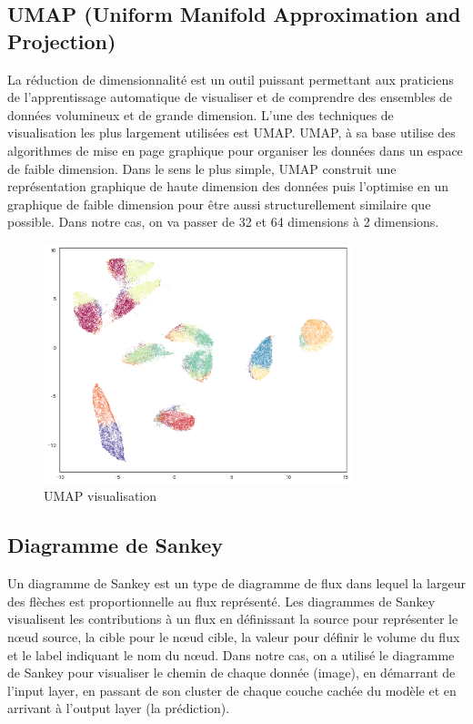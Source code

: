 \documentclass[oneside,13pt,a4paper]{report}
\begin{document}
\subsection{UMAP (Uniform Manifold Approximation and Projection)}
La réduction de dimensionnalité est un outil puissant permettant aux praticiens de l'apprentissage automatique de visualiser et de comprendre des ensembles de données volumineux et de grande dimension. L'une des techniques de visualisation les plus largement utilisées est UMAP.
UMAP, à sa base utilise des algorithmes de mise en page graphique pour organiser les données dans un espace de faible dimension. Dans le sens le plus simple, UMAP construit une représentation graphique de haute dimension des données puis l'optimise en un graphique de faible dimension pour être aussi structurellement similaire que possible. Dans notre cas, on va passer de 32 et 64 dimensions à 2 dimensions.
\begin{figure}[!h]
\center
\includegraphics[width=0.8\textwidth]{img/UMAP.png}
\caption{UMAP visualisation}
\end{figure}

\subsection{Diagramme de Sankey}
Un diagramme de Sankey est un type de diagramme de flux dans lequel la largeur des flèches est proportionnelle au flux représenté.
Les diagrammes de Sankey visualisent les contributions à un flux en définissant la source pour représenter le nœud source, la cible pour le nœud cible, la valeur pour définir le volume du flux et le label indiquant le nom du nœud. Dans notre cas, on a utilisé le diagramme de Sankey pour visualiser le chemin de chaque donnée (image), en démarrant de l'input layer, en passant de son cluster de chaque couche cachée du modèle et en arrivant à l'output layer (la prédiction).
\end{document}
